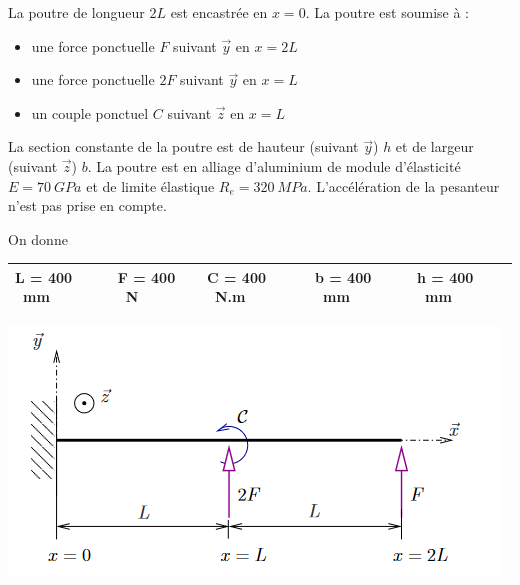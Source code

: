 \documentclass[lecture.tex]{subfiles}
\begin{document}

La poutre de longueur $2L$ est encastrée en $x=0$. La poutre est soumise à :
\begin{itemize}[label =,font =\tiny]
  \item une force ponctuelle $F$ suivant $\vec{y}$ en $x=2L$
  \item une force ponctuelle $2F$ suivant $\vec{y}$ en $x=L$
  \item un couple ponctuel $C$ suivant $\vec{z}$ en $x=L$
\end{itemize}

La section constante de la poutre est de hauteur (suivant $\vec{y}$) $h$ et de largeur (suivant $\vec{z}$) $b$. La poutre est en alliage d'aluminium de module d'élasticité $E=70 \ GPa$ et de limite élastique $R_{e}=320 \ MPa$. L'accélération de la pesanteur n'est pas prise en compte.

\medskip

On donne

\begin{center}
  \begin{tabular}{|l|l|l|l|l|}
    \hline\vspace{2pt}
    L = 400 \ mm &
    F = 400 \ N &
    C = 400 \ N.m &
    b = 400 \ mm &
    h = 400 \ mm \\
    \hline
  \end{tabular}
\end{center}

\begin{center}
  \includegraphics[scale=0.7]{figA0027.png}
\end{center}
\end{document}
